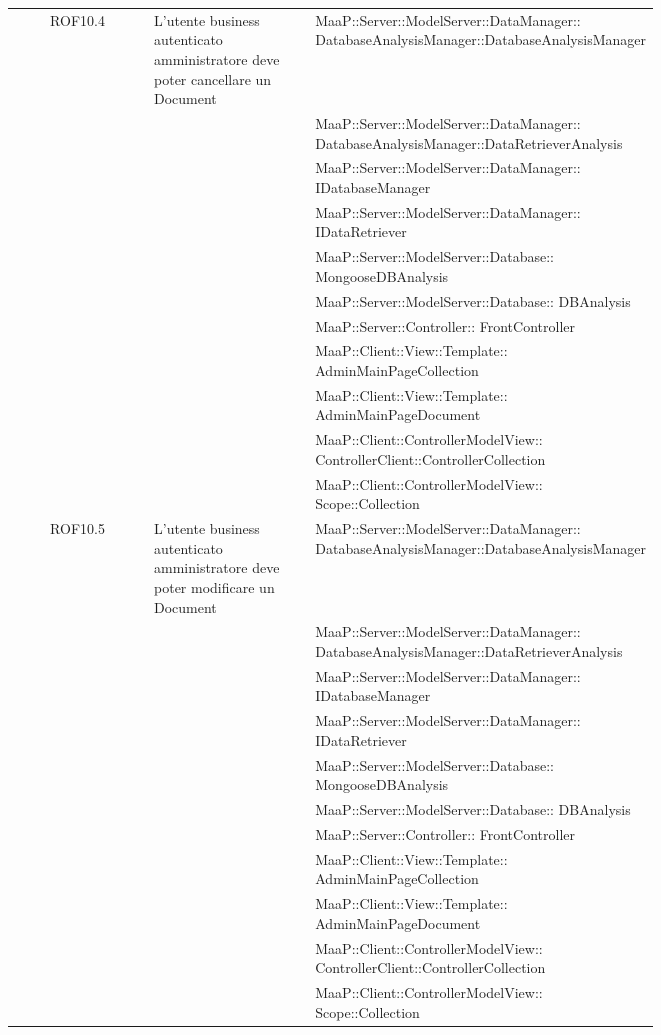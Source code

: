 \begin{center}
\begin{longtable}{|c|p{0.25\linewidth}|p{0.5\linewidth}|}
\midrule
ROF10.4
& L'utente business autenticato amministratore deve poter cancellare un Document
& MaaP::Server::ModelServer::DataManager:: DatabaseAnalysisManager::DatabaseAnalysisManager\\
& & MaaP::Server::ModelServer::DataManager:: DatabaseAnalysisManager::DataRetrieverAnalysis\\
& & MaaP::Server::ModelServer::DataManager:: IDatabaseManager\\
& & MaaP::Server::ModelServer::DataManager:: IDataRetriever\\
& & MaaP::Server::ModelServer::Database:: MongooseDBAnalysis\\
& & MaaP::Server::ModelServer::Database:: DBAnalysis\\
& & MaaP::Server::Controller:: FrontController\\
& & MaaP::Client::View::Template:: AdminMainPageCollection\\
& & MaaP::Client::View::Template:: AdminMainPageDocument\\
& & MaaP::Client::ControllerModelView:: ControllerClient::ControllerCollection\\
& & MaaP::Client::ControllerModelView:: Scope::Collection\\

\midrule
ROF10.5
& L'utente business autenticato amministratore deve poter modificare un Document
& MaaP::Server::ModelServer::DataManager:: DatabaseAnalysisManager::DatabaseAnalysisManager\\
& & MaaP::Server::ModelServer::DataManager:: DatabaseAnalysisManager::DataRetrieverAnalysis\\
& & MaaP::Server::ModelServer::DataManager:: IDatabaseManager\\
& & MaaP::Server::ModelServer::DataManager:: IDataRetriever\\
& & MaaP::Server::ModelServer::Database:: MongooseDBAnalysis\\
& & MaaP::Server::ModelServer::Database:: DBAnalysis\\
& & MaaP::Server::Controller:: FrontController\\
& & MaaP::Client::View::Template:: AdminMainPageCollection\\
& & MaaP::Client::View::Template:: AdminMainPageDocument\\
& & MaaP::Client::ControllerModelView:: ControllerClient::ControllerCollection\\
& & MaaP::Client::ControllerModelView:: Scope::Collection\\


\end{longtable}
\end{center}
